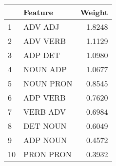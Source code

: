 \begin{tabular}{llr}
\toprule
{} &    Feature &  Weight \\
\midrule
1  &    ADV ADJ &  1.8248 \\
2  &   ADV VERB &  1.1129 \\
3  &    ADP DET &  1.0980 \\
4  &   NOUN ADP &  1.0677 \\
5  &  NOUN PRON &  0.8545 \\
6  &   ADP VERB &  0.7620 \\
7  &   VERB ADV &  0.6984 \\
8  &   DET NOUN &  0.6049 \\
9  &   ADP NOUN &  0.4572 \\
10 &  PRON PRON &  0.3932 \\
\bottomrule
\end{tabular}
